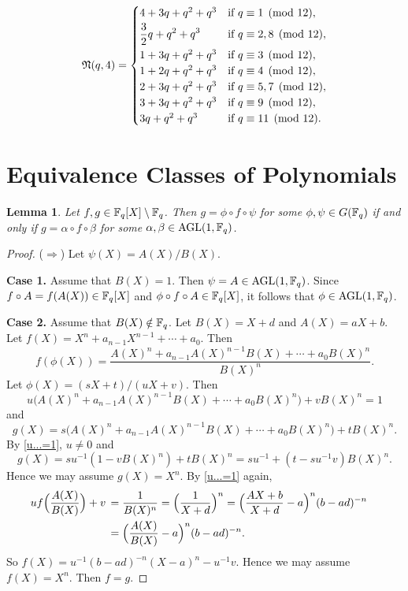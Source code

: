 \documentclass{amsart}
\newtheorem{lem}[thm]{Lemma}
\numberwithin{equation}{section}
\theoremstyle{definition}
\newcommand{\f}{\Bbb F}
\begin{document}
\[
\frak N(q,4)=\begin{cases}
4+3q+q^2+q^3&\text{if}\ q\equiv 1\pmod{12},\vspace{0.2em}\cr
\displaystyle\frac 32q+q^2+q^3&\text{if}\ q\equiv 2,8\pmod{12},\vspace{0.2em}\cr
1+3q+q^2+q^3&\text{if}\ q\equiv 3\pmod{12},\cr
1+2q+q^2+q^3&\text{if}\ q\equiv 4\pmod{12},\cr
2+3q+q^2+q^3&\text{if}\ q\equiv 5,7\pmod{12},\cr
3+3q+q^2+q^3&\text{if}\ q\equiv 9\pmod{12},\cr
3q+q^2+q^3&\text{if}\ q\equiv 11\pmod{12}.
\end{cases}
\]



\section{Equivalence Classes of Polynomials}

\begin{lem}\label{L8.1}
Let $f,g\in\f_q[X]\setminus\f_q$. Then $g=\phi\circ f\circ \psi$ for some $\phi,\psi\in G(\f_q)$ if and only if $g=\alpha\circ f\circ\beta$ for some $\alpha,\beta\in\text{\rm AGL}(1,\f_q)$.
\end{lem}

\begin{proof}
($\Rightarrow$) Let $\psi(X)=A(X)/B(X)$. 

\medskip
{\bf Case 1.} Assume that $B(X)=1$. Then $\psi=A\in\text{AGL}(1,\f_q)$. Since $f\circ A=f(A(X))\in\f_q[X]$ and $\phi\circ f\circ A\in\f_q[X]$, it follows that $\phi\in \text{AGL}(1,\f_q)$.

\medskip
{\bf Case 2.} Assume that $B(X)\notin\f_q$. Let $B(X)=X+d$ and $A(X)=aX+b$. Let $f(X)=X^n+a_{n-1}X^{n-1}+\cdots+a_0$. Then 
\[
f(\phi(X))=\frac{A(X)^n+a_{n-1}A(X)^{n-1}B(X)+\cdots+a_0B(X)^n}{B(X)^n}.
\]
Let $\phi(X)=(sX+t)/(uX+v)$. Then
\begin{equation}\label{u...=1}
u\bigl(A(X)^n+a_{n-1}A(X)^{n-1}B(X)+\cdots+a_0B(X)^n \bigr)+vB(X)^n=1
\end{equation}
and 
\[
g(X)=s\bigl(A(X)^n+a_{n-1}A(X)^{n-1}B(X)+\cdots+a_0B(X)^n \bigr)+tB(X)^n.
\]
By \eqref{u...=1}, $u\ne 0$ and
\[
g(X)=su^{-1}(1-vB(X)^n)+tB(X)^n=su^{-1}+(t-su^{-1}v)B(X)^n.
\]
Hence we may assume $g(X)=X^n$. By \eqref{u...=1} again,
\begin{align*}
uf\Bigl(\frac{A(X)}{B(X)}\Bigr)+v\,&=\frac 1{B(X)^n}=\Bigl(\frac 1{X+d}\Bigr)^n=\Bigl(\frac{AX+b}{X+d}-a\Bigr)^n(b-ad)^{-n}\cr
&=\Bigl(\frac{A(X)}{B(X)}-a\Bigr)^n(b-ad)^{-n}.
\end{align*}
So $f(X)=u^{-1}(b-ad)^{-n}(X-a)^n-u^{-1}v$. Hence we may assume $f(X)=X^n$. Then $f=g$.
\end{proof}
\end{document}
